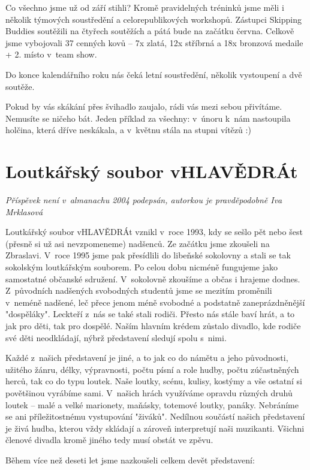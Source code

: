 \documentclass[a5paper, 12pt, twoside]{article}
\begin{document}
Co všechno jsme už od září stihli? Kromě pravidelných tréninků jsme měli
i několik týmových soustředění a celorepublikových workshopů. Zástupci
Skipping Buddies soutěžili na čtyřech soutěžích a pátá bude na začátku
června. Celkově jsme vybojovali 37 cenných kovů -- 7x zlatá, 12x
stříbrná a 18x bronzová medaile + 2. místo v~team show.

Do konce kalendářního roku nás čeká letní soustředění, několik
vystoupení a dvě soutěže.

Pokud by vás skákání přes švihadlo zaujalo, rádi vás mezi sebou
přivítáme. Nemusíte se ničeho bát. Jeden příklad za všechny: v~únoru
k~nám nastoupila holčina, která dříve neskákala, a v~květnu stála na
stupni vítězů :)

\section{Loutkářský soubor
vHLAVĚDRÁt}

\textit{Příspěvek není v~almanachu 2004 podepsán, autorkou je
pravděpodobně Iva Mrklasová}

Loutkářský soubor vHLAVĚDRÁt vznikl v~roce 1993, kdy se sešlo pět nebo
šest (přesně si už asi nevzpomeneme) nadšenců. Ze začátku jsme zkoušeli
na Zbraslavi. V~roce 1995 jsme pak přesídlili do libeňské sokolovny a
stali se tak sokolským loutkářským souborem. Po celou dobu nicméně
fungujeme jako samostatné občanské sdružení. V~sokolovně zkoušíme a
občas i hrajeme dodnes. Z~původních nadšených svobodných studentů jsme
se mezitím proměnili v~neméně nadšené, leč přece jenom méně svobodné a
podstatně zaneprázdněnější "dospěláky". Leckteří z~nás se také stali
rodiči. Přesto nás stále baví hrát, a to jak pro děti, tak pro dospělé.
Naším hlavním krédem zůstalo divadlo, kde rodiče své děti neodkládají,
nýbrž představení sledují spolu s~nimi.

Každé z~našich představení je jiné, a to jak co do námětu a jeho
původnosti, užitého žánru, délky, výpravnosti, počtu písní a role hudby,
počtu zúčastněných herců, tak co do typu loutek. Naše loutky, scénu,
kulisy, kostýmy a vše ostatní si povětšinou vyrábíme sami. V~našich
hrách využíváme opravdu různých druhů loutek -- malé a velké marionety,
maňásky, totemové loutky, panáky. Nebráníme se ani příležitostnému
vystupování "živáků". Nedílnou součástí našich představení je živá
hudba, kterou vždy skládají a zároveň interpretují naši muzikanti.
Všichni členové divadla kromě jiného tedy musí obstát ve zpěvu.

Během více než deseti let jsme nazkoušeli celkem devět představení:
\end{document}
